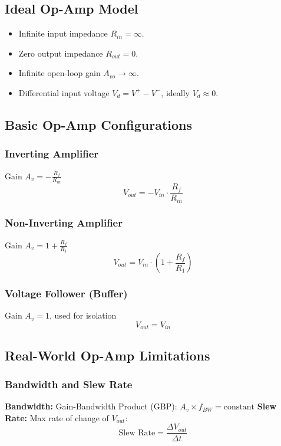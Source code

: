\documentclass[9pt]{article}
\begin{document}
\begin{multicols*}{2}
\subsection{Ideal Op-Amp Model}
\begin{itemize}\itemsep0pt
    \item Infinite input impedance \(R_{in} = \infty\).
    \item Zero output impedance \(R_{out} = 0\).
    \item Infinite open-loop gain \(A_{vo} \to \infty\).
    \item Differential input voltage \(V_d = V^+ - V^-\), ideally \(V_d \approx 0\).
\end{itemize}

\subsection{Basic Op-Amp Configurations}

\subsubsection{Inverting Amplifier}
Gain \(A_v = -\frac{R_f}{R_{in}}\)
\[
V_{out} = -V_{in} \cdot \frac{R_f}{R_{in}}
\]

\subsubsection{Non-Inverting Amplifier}
Gain \(A_v = 1 + \frac{R_f}{R_1}\)
\[
V_{out} = V_{in} \cdot \left(1 + \frac{R_f}{R_1}\right)
\]

\subsubsection{Voltage Follower (Buffer)}
Gain \(A_v = 1\), used for isolation
\[
V_{out} = V_{in}
\]

\subsection{Real-World Op-Amp Limitations}

\subsubsection{Bandwidth and Slew Rate}
\textbf{Bandwidth:} Gain-Bandwidth Product (GBP): \(A_v \times f_{BW} = \text{constant}\)
\textbf{Slew Rate:} Max rate of change of \( V_{out} \):
\[
\text{Slew Rate} = \frac{\Delta V_{out}}{\Delta t}
\]


\end{multicols*}
\end{document}
